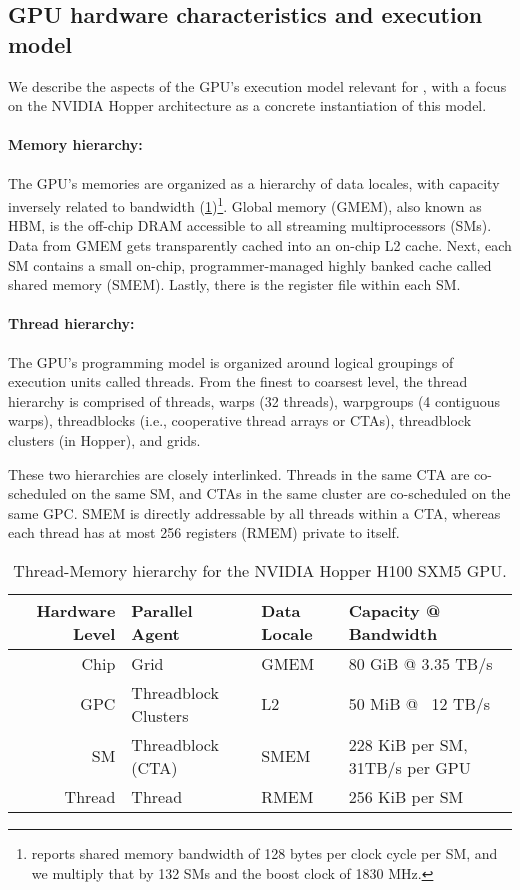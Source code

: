 \subsection{GPU hardware characteristics and execution model}
\label{subsec:hardware}

We describe the aspects of the GPU's execution model relevant for \fat, with a focus on the NVIDIA Hopper architecture as a concrete instantiation of this model.

\paragraph{Memory hierarchy:} The GPU's memories are organized as a hierarchy of data locales, with capacity inversely related to bandwidth (\cref{tab:gpu-hierarchy})\footnote{\citet{luo2024benchmarking} reports shared memory bandwidth of 128 bytes per clock cycle per SM, and we multiply that by 132 SMs and the boost clock of 1830 MHz.}.
Global memory (GMEM), also known as HBM, is the off-chip DRAM accessible to all streaming multiprocessors (SMs).
Data from GMEM gets transparently cached into an on-chip L2 cache.
Next, each SM contains a small on-chip, programmer-managed highly banked cache called shared memory (SMEM). 
Lastly, there is the register file within each SM.

\paragraph{Thread hierarchy:} The GPU's programming model is organized around logical groupings of execution units called threads.
From the finest to coarsest level, the thread hierarchy is comprised of threads, warps (32 threads), warpgroups (4 contiguous warps), threadblocks (i.e., cooperative thread arrays or CTAs), threadblock clusters (in Hopper), and grids.

These two hierarchies are closely interlinked.
Threads in the same CTA are co-scheduled on the same SM, and CTAs in the same cluster are co-scheduled on the same GPC.
SMEM is directly addressable by all threads within a CTA, whereas each thread has at most 256 registers (RMEM) private to itself.




\begin{table}[h!]
  \small
  \centering
  \caption{Thread-Memory hierarchy for the NVIDIA Hopper H100 SXM5 GPU.}
  \label{tab:gpu-hierarchy}
  \begin{tabular}{|r|l|l|l|}
      \hline
      \textbf{Hardware Level} & \textbf{Parallel Agent} & \textbf{Data Locale} & \textbf{Capacity @ Bandwidth} \\
      \hline
      Chip   & Grid                 & GMEM & 80  GiB @ 3.35 TB/s \\
      GPC    & Threadblock Clusters & L2   & 50  MiB @ ~12 TB/s \\
      SM     & Threadblock (CTA)    & SMEM & 228 KiB per SM, 31TB/s per GPU \\
      Thread & Thread               & RMEM & 256 KiB per SM \\
      \hline
  \end{tabular}
\end{table}




